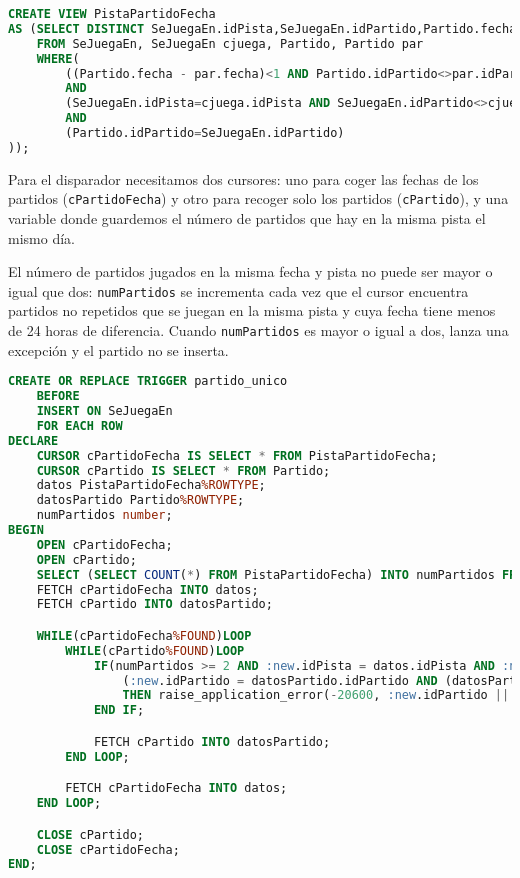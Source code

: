 \begin{lstlisting}[language=sql]
CREATE VIEW PistaPartidoFecha
AS (SELECT DISTINCT SeJuegaEn.idPista,SeJuegaEn.idPartido,Partido.fecha
	FROM SeJuegaEn, SeJuegaEn cjuega, Partido, Partido par
	WHERE(
		((Partido.fecha - par.fecha)<1 AND Partido.idPartido<>par.idPartido)
		AND
		(SeJuegaEn.idPista=cjuega.idPista AND SeJuegaEn.idPartido<>cjuega.idPartido)
		AND
		(Partido.idPartido=SeJuegaEn.idPartido)
));
\end{lstlisting}

Para el disparador necesitamos dos cursores: uno para coger las fechas de los
partidos (\texttt{cPartidoFecha}) y otro para recoger solo los partidos
(\texttt{cPartido}), y una variable donde guardemos el número de partidos que
hay en la misma pista el mismo día.

El número de partidos jugados en la misma fecha y pista no puede ser mayor o
igual que dos: \texttt{numPartidos} se incrementa cada vez que el cursor encuentra
partidos no repetidos que se juegan en la misma pista y cuya fecha tiene menos
de 24 horas de diferencia. Cuando \texttt{numPartidos} es mayor o igual a dos, lanza
una excepción y el partido no se inserta.

\begin{lstlisting}[language=sql]
CREATE OR REPLACE TRIGGER partido_unico
	BEFORE
	INSERT ON SeJuegaEn
	FOR EACH ROW
DECLARE
	CURSOR cPartidoFecha IS SELECT * FROM PistaPartidoFecha;
	CURSOR cPartido IS SELECT * FROM Partido;
	datos PistaPartidoFecha%ROWTYPE;
	datosPartido Partido%ROWTYPE;
	numPartidos number;
BEGIN
	OPEN cPartidoFecha;
	OPEN cPartido;
	SELECT (SELECT COUNT(*) FROM PistaPartidoFecha) INTO numPartidos FROM dual;
	FETCH cPartidoFecha INTO datos;
	FETCH cPartido INTO datosPartido;

	WHILE(cPartidoFecha%FOUND)LOOP
		WHILE(cPartido%FOUND)LOOP
			IF(numPartidos >= 2 AND :new.idPista = datos.idPista AND :new.idPartido <> datos.idPartido AND
				(:new.idPartido = datosPartido.idPartido AND (datosPartido.fecha-datos.fecha) < 1))
				THEN raise_application_error(-20600, :new.idPartido || 'No se jugar más de dos partidos en la misma pista en un mismo dia');
			END IF;

			FETCH cPartido INTO datosPartido;
		END LOOP;

		FETCH cPartidoFecha INTO datos;
	END LOOP;

	CLOSE cPartido;
	CLOSE cPartidoFecha;
END;
\end{lstlisting}

\pagebreak

